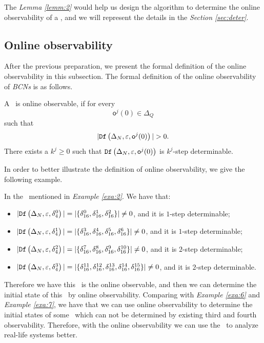 The {\em Lemma \ref{lemm:2}} would help us design the algorithm to determine the online observability of a \BCN, and we will represent the details in the {\em Section \ref{sec:deter}}.

\subsection{Online observability}
After the previous preparation, we present the formal definition of the online observability in this subsection. The formal definition of the online observability of {\em BCNs} is as follows.

\begin{definition}
 A \BCN\ is online observable,
if for every \[\mathsf{o}^{j}(0)\in \Delta_Q\] such that \[|\Ded\left(\Delta_N,\varepsilon, \mathsf{o}^{j}(0)\right)|> 0.\] There exists a $k^{j}\ge0$ such that ${\tt Df}\left(\Delta_N,\varepsilon,\mathsf{o}^{j}(0)\right)$ is $k^{j}$-step determinable.
\end{definition}

 In order to better illustrate the definition of online observability, we give the following example.

\begin{example}
In the \BCN\ mentioned in {\em Example \ref{exa:2}}.  We have that:
 \begin{itemize}
 \item $|{\tt Df}\left(\Delta_N,\varepsilon, \delta_{4}^0\right)|=|\{\delta_{16}^0,\delta_{16}^1,\delta_{16}^2\}|\neq 0$, and it is $1$-step determinable;
 \item $|{\tt Df}\left(\Delta_N,\varepsilon, \delta_{4}^1\right)|=|\{\delta_{16}^3,\delta_{16}^4,\delta_{16}^5,\delta_{16}^6\}|\neq 0$, and it is $1$-step determinable;
 \item $|{\tt Df}\left(\Delta_N,\varepsilon, \delta_{4}^2\right)|=|\{\delta_{16}^7,\delta_{16}^8,\delta_{16}^{9},\delta_{16}^{10}\}|\neq 0$, and it is $2$-step determinable;
 \item $|{\tt Df}\left(\Delta_N,\varepsilon, \delta_{4}^3\right)|=|\{\delta_{16}^{11},\delta_{16}^{12},\delta_{16}^{13},\delta_{16}^{14},\delta_{16}^{15}\}|\neq 0$, and it is $2$-step determinable.
 \end{itemize}
 
Therefore we have this \BCN\ is the online observable, and then we can determine the initial state of this \BCN\ by online observability. Comparing with {\em Example \ref{exa:6}} and {\em Example \ref{exa:7}}, we have that we can use online observability to determine the initial states of some \BCNs\ which can not be determined by existing third and fourth observability. Therefore, with the online observability we can use the \BCN\ to analyze real-life systems better.
\label{exa:10}
\end{example}  

